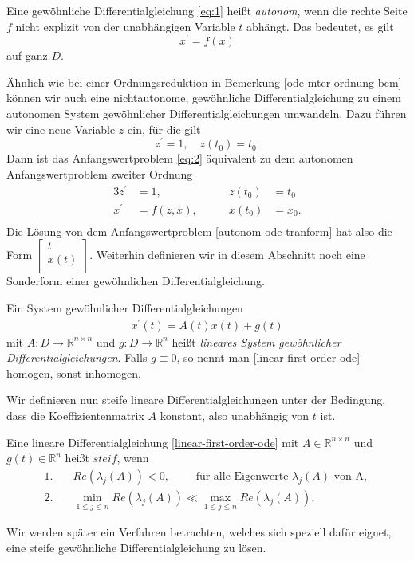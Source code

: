 \begin{definition}
    Eine gewöhnliche Differentialgleichung \eqref{eq:1} heißt {\em autonom}, wenn die rechte Seite $f$ nicht
    explizit von der unabhängigen Variable $t$ abhängt. Das bedeutet, es gilt
    \[
        x^{\prime} = f(x)
    \]
    auf ganz $D$.
\end{definition}
Ähnlich wie bei einer Ordnungsreduktion in Bemerkung \ref{ode-mter-ordnung-bem} können wir auch eine nichtautonome,
gewöhnliche Differentialgleichung zu einem autonomen System gewöhnlicher Differentialgleichungen umwandeln. Dazu führen
wir eine neue Variable $z$ ein, für die gilt
\[
    z^{\prime} = 1, \quad z(t_0) = t_0.
\]
Dann ist das Anfangswertproblem \eqref{eq:2} äquivalent zu dem autonomen Anfangswertproblem zweiter Ordnung
\begin{alignat}{3}
    \label{autonom-ode-tranform}
    z^{\prime} &= 1, \qquad &z(t_0) &= t_0 \nonumber\\
    x^{\prime} &= f(z,x),\qquad  &x(t_0) &= x_0. \\
\end{alignat}
Die Lösung von dem Anfangswertproblem \eqref{autonom-ode-tranform} hat also die Form
$\left[ \begin{matrix} t\\ x(t)\\ \end{matrix} \right].$ Weiterhin definieren wir in diesem Abschnitt noch eine
Sonderform einer gewöhnlichen Differentialgleichung.
\begin{definition}
    Ein System gewöhnlicher Differentialgleichungen
    \begin{align}
        \label{linear-first-order-ode}
        x^{\prime}(t) = A(t)x(t) + g(t)
    \end{align}
    mit $A:D \rightarrow \mathbb{R}^{n \times n}$ und $g:D \rightarrow \mathbb{R}^n$ heißt
        {\em lineares System gewöhnlicher Differentialgleichungen}. Falls $g \equiv 0$, so nennt man
    \eqref{linear-first-order-ode} homogen, sonst inhomogen.
\end{definition}
Wir definieren nun steife lineare Differentialgleichungen unter der Bedingung, dass die Koeffizientenmatrix $A$ konstant,
also unabhängig von $t$ ist.
\begin{definition}
    \label{steife-dgl}
    Eine lineare Differentialgleichung \eqref{linear-first-order-ode} mit $A \in \mathbb{R}^{n \times n}$ und
    $g(t) \in \mathbb{R}^n$ heißt $steif$, wenn
    \begin{align*}
        1.& \quad Re(\lambda_j(A)) < 0, \qquad \text{ für alle Eigenwerte } \lambda_j(A) \text{ von A, }\\
        2.& \quad \min\limits_{1 \leq j \leq n} Re(\lambda_j(A)) \ll \max\limits_{1 \leq j \leq n} Re(\lambda_j(A)).
    \end{align*}
\end{definition}
Wir werden später ein Verfahren betrachten, welches sich speziell dafür eignet, eine steife gewöhnliche
Differentialgleichung zu lösen.

